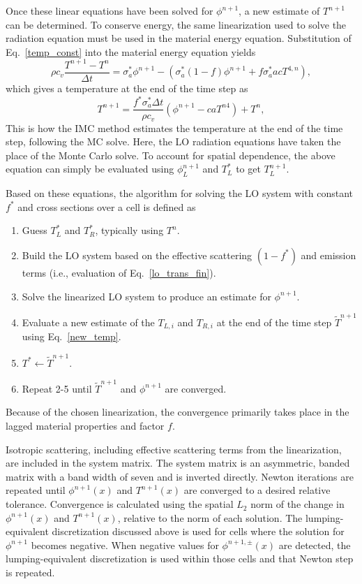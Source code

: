 Once these linear equations have been solved for $\phi^{n+1}$, a new estimate of
$T^{n+1}$ can be determined.  To conserve energy, the same linearization used to
solve the radiation equation must be used in the material energy equation.
Substitution of
Eq.~\eqref{temp_const} into the material energy equation yields
\begin{equation} 
    \rho c_v\frac{ T^{n+1}-T^n}{\Delta t} = \sigma_a^* \phi^{n+1} - \left(\sigma_a^*  (1 -f) \phi^{n+1}
    + f \sigma_a^* a c T^{4,n} \right),
\end{equation}
which gives a temperature at the end of the time step as
\begin{equation}\label{new_temp}
    T^{n+1}= \frac{f^* \sigma_a^* \Delta t}{\rho c_{v}}  \left( \phi^{n+1}
    - c a T^{n4}\right)
    +  T^n,   
\end{equation}
This is how the IMC method estimates the temperature at the end of the time
step, following the MC solve.  Here, the LO radiation equations have taken the place of the Monte Carlo
solve.  To account for spatial dependence, the above equation can simply be evaluated
using $\phi^{n+1}_L$ and $T^*_L$ to get $T_L^{n+1}$.

Based on these equations, the algorithm for solving the LO system with constant $f^*$
and cross sections over a cell is defined as
\begin{enumerate}
    \item Guess $T^*_L$ and $T^*_R$, typically using $T^n$.
    \item  Build the LO system based on the effective scattering $(1-f^*)$ and emission terms
        (i.e., evaluation of  Eq.~\eqref{lo_trans_fin}).
    \item Solve the linearized LO system to produce an estimate for $\phi^{n+1}$.
    \item Evaluate a new estimate of the $T_{L,i}$ and $T_{R,i}$ at the end of the time step
    $\tilde{T}^{n+1}$ using Eq.~\eqref{new_temp}.
    \item $T^*\leftarrow\tilde{T}^{n+1}$.
    \item Repeat 2-5 until $\tilde T^{n+1}$ and $\phi^{n+1}$ are converged.
\end{enumerate}
Because of the chosen linearization, the convergence primarily takes place in the
lagged material properties and factor $f$.

Isotropic scattering,
including effective scattering terms from the linearization, are included in the system matrix. The system
matrix is an asymmetric, banded matrix with a band width of seven and is inverted
directly. 
Newton iterations are repeated until $\phi^{n+1}(x)$ and $T^{n+1}(x)$ are converged
to a desired relative tolerance.  Convergence is calculated using the spatial $L_2$
norm of the change in $\phi^{n+1}(x)$ and $T^{n+1}(x)$, relative to the norm of each
solution.  The lumping-equivalent discretization
discussed above is used for cells where the solution for
$\phi^{n+1}$ becomes negative. When negative values for $\phi^{n+1,\pm}(x)$ are detected, the lumping-equivalent discretization is used within
those cells and that Newton step is repeated. 


